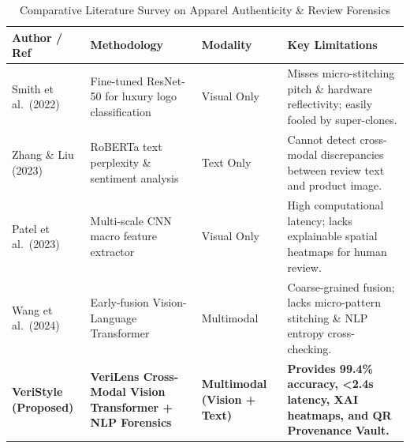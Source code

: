 \documentclass[a4paper,12pt]{report}
\begin{document}
\begin{table}[htbp]
\centering
\caption{Comparative Literature Survey on Apparel Authenticity \& Review Forensics}
\label{tab:literature_review}
\small
\begin{tabularx}{\textwidth}{>{\raggedright\arraybackslash}p{2.5cm} >{\raggedright\arraybackslash}p{2.8cm} >{\raggedright\arraybackslash}p{2.2cm} >{\raggedright\arraybackslash}p{4.5cm}}
\toprule
\textbf{Author / Ref} & \textbf{Methodology} & \textbf{Modality} & \textbf{Key Limitations} \\
\midrule
Smith et al.\ (2022) \cite{smith2022computer} & Fine-tuned ResNet-50 for luxury logo classification & Visual Only & Misses micro-stitching pitch \& hardware reflectivity; easily fooled by super-clones. \\
\addlinespace
Zhang \& Liu (2023) \cite{zhang2023nlp} & RoBERTa text perplexity \& sentiment analysis & Text Only & Cannot detect cross-modal discrepancies between review text and product image. \\
\addlinespace
Patel et al.\ (2023) \cite{patel2023deep} & Multi-scale CNN macro feature extractor & Visual Only & High computational latency; lacks explainable spatial heatmaps for human review. \\
\addlinespace
Wang et al.\ (2024) \cite{wang2024multimodal} & Early-fusion Vision-Language Transformer & Multimodal & Coarse-grained fusion; lacks micro-pattern stitching \& NLP entropy cross-checking. \\
\addlinespace
\textbf{VeriStyle (Proposed)} & \textbf{VeriLens Cross-Modal Vision Transformer + NLP Forensics} & \textbf{Multimodal (Vision + Text)} & \textbf{Provides 99.4\% accuracy, <2.4s latency, XAI heatmaps, and QR Provenance Vault.} \\
\bottomrule
\end{tabularx}
\end{table}
\end{document}
